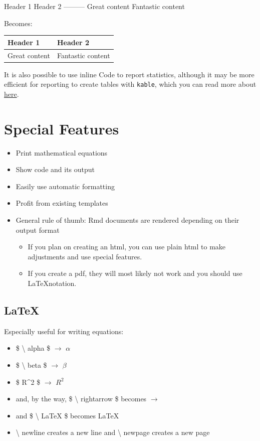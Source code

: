 \documentclass[
]{book}
\providecommand{\tightlist}{%
  \setlength{\itemsep}{0pt}\setlength{\parskip}{0pt}}
\begin{document}
Header 1 \textbar{} Header 2
-----\textbar-----
Great content \textbar{} Fantastic content

Becomes:

\begin{longtable}[]{@{}ll@{}}
\toprule\noalign{}
Header 1 & Header 2 \\
\midrule\noalign{}
\endhead
\bottomrule\noalign{}
\endlastfoot
Great content & Fantastic content \\
\end{longtable}

It is also possible to use inline Code to report statistics, although it may be more efficient for reporting to create tables with \texttt{kable}, which you can read more about \href{https://cran.r-project.org/web/packages/kableExtra/vignettes/awesome_table_in_html.html}{here}.

\section{Special Features}\label{special-features}

\begin{itemize}
\tightlist
\item
  Print mathematical equations
\item
  Show code and its output
\item
  Easily use automatic formatting
\item
  Profit from existing templates
\item
  General rule of thumb: Rmd documents are rendered depending on their output format

  \begin{itemize}
  \tightlist
  \item
    If you plan on creating an html, you can use plain html to make adjustments and use special features.
  \item
    If you create a pdf, they will most likely not work and you should use \LaTeX notation.
  \end{itemize}
\end{itemize}

\subsection{\texorpdfstring{\LaTeX}{}}\label{section}

Especially useful for writing equations:

\begin{itemize}
\tightlist
\item
  \$ \textbackslash{} alpha \$ \(\rightarrow\) \(\alpha\)
\item
  \$ \textbackslash{} beta \$ \(\rightarrow\) \(\beta\)
\item
  \$ R\^{}2 \$ \(\rightarrow\) \(R^2\)
\item
  and, by the way, \$ \textbackslash{} rightarrow \$ becomes \(\rightarrow\)
\item
  and \$ \textbackslash{} LaTeX \$ becomes \LaTeX
\item
  \textbackslash{} newline creates a new line and \textbackslash{} newpage creates a new page
\end{itemize}
\end{document}
